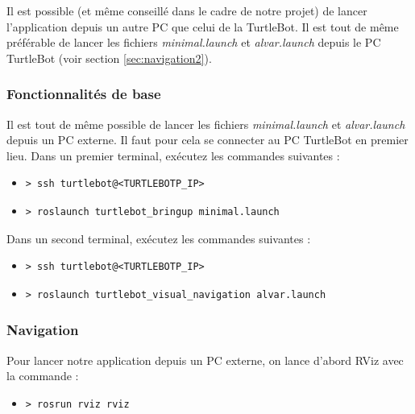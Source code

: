 \documentclass[10pt,a4paper]{article}
\begin{document}
Il est possible (et même conseillé dans le cadre de notre projet) de lancer l'application depuis un autre PC que celui de la TurtleBot.
Il est tout de même préférable de lancer les fichiers \upshape \emph{minimal.launch} et \upshape \emph{alvar.launch} depuis le PC TurtleBot (voir section \ref{sec:navigation2}).

\subsubsection{Fonctionnalités de base}

Il est tout de même possible de lancer les fichiers \upshape \emph{minimal.launch} et \upshape \emph{alvar.launch} depuis un PC externe. Il faut pour cela se connecter au PC TurtleBot en premier lieu.
Dans un premier terminal, exécutez les commandes suivantes :

\begin{itemize}
\item[]  \begin{verbatim}> ssh turtlebot@<TURTLEBOTP_IP> \end{verbatim}
\item[]  \begin{verbatim}> roslaunch turtlebot_bringup minimal.launch \end{verbatim}
\end{itemize}

Dans un second terminal, exécutez les commandes suivantes :

\begin{itemize}
\item[]  \begin{verbatim}> ssh turtlebot@<TURTLEBOTP_IP> \end{verbatim}
\item[]  \begin{verbatim}> roslaunch turtlebot_visual_navigation alvar.launch \end{verbatim}
\end{itemize}

\subsubsection{Navigation}

Pour lancer notre application depuis un PC externe, on lance d'abord RViz avec la commande :
\begin{itemize}
\item[]  \begin{verbatim}> rosrun rviz rviz \end{verbatim}
\end{itemize}
\end{document}
